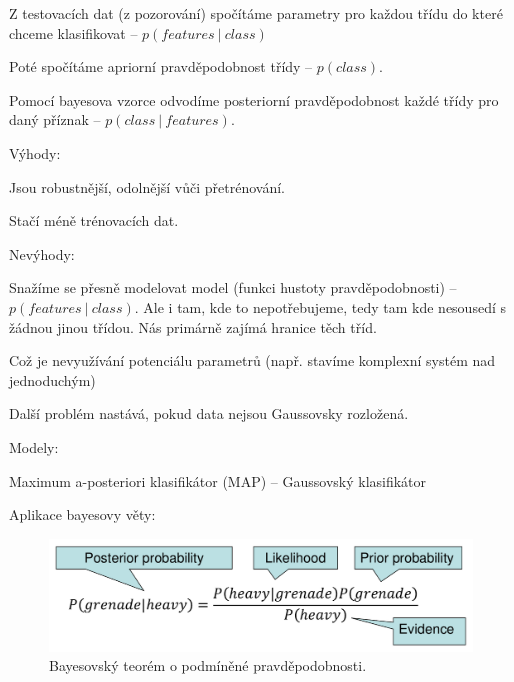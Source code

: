 \begin{compactitem}
    \item Z testovacích dat (z pozorování) spočítáme parametry pro každou třídu do které chceme klasifikovat -- $p(features ~|~ class)$

    \item Poté spočítáme apriorní pravděpodobnost třídy -- $p(class)$.

    \item Pomocí bayesova vzorce odvodíme posteriorní pravděpodobnost každé třídy pro daný příznak -- $p(class ~|~ features)$.

    \item Výhody: \begin{compactitem}
        \item Jsou robustnější, odolnější vůči přetrénování.
        \item Stačí méně trénovacích dat.
    \end{compactitem}

    \item Nevýhody: \begin{compactitem}
        \item Snažíme se přesně modelovat model (funkci hustoty pravděpodobnosti) --\break $p(features ~|~ class)$. Ale i tam, kde to nepotřebujeme, tedy tam kde nesousedí s žádnou jinou třídou. Nás primárně zajímá hranice těch tříd.
        \item Což je nevyužívání potenciálu parametrů (např. stavíme komplexní systém nad jednoduchým)
        \item Další problém nastává, pokud data nejsou Gaussovsky rozložená.
    \end{compactitem}

    \item Modely: \begin{compactitem}
        \item Maximum a-posteriori klasifikátor (MAP) -- Gaussovský klasifikátor
    \end{compactitem}

    \item Aplikace bayesovy věty:
    \begin{figure}[H]
        \centering
        \includegraphics[width=0.75\linewidth]{bayes.pdf}
        \caption{Bayesovský teorém o podmíněné pravděpodobnosti.}
    \end{figure}


\end{compactitem}

